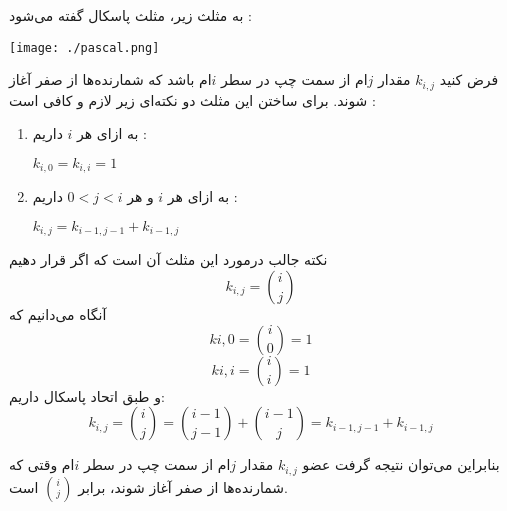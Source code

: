 
به مثلث زیر، مثلث پاسکال گفته می‌شود :

\begin{center}
  \texttt{[image: ./pascal.png]}
\end{center}

فرض کنید
$k_{i,j}$
مقدار 
$j$ام
از سمت چپ در سطر
$i$ام
باشد که شمارنده‌ها از صفر آغاز شوند. برای ساختن این مثلث دو نکته‌ای زیر لازم و کافی است :
\begin{enumerate}
  \item 
  به ازای هر
  $i$
  داریم :
  \begin{center}
    $k_{i,0} = k_{i,i} = 1$
  \end{center}

  \item 
  به ازای هر 
  $i$ و هر
  $0 < j < i$
  داریم :
  \begin{center}
    $k_{i,j} = k_{i-1,j-1} + k_{i-1,j}$
  \end{center}
\end{enumerate}

نکته جالب درمورد این مثلث آن است که اگر قرار دهیم
$$k_{i,j} = {i \choose j}$$
آنگاه می‌دانیم که
$$k{i,0} = {i \choose 0} = 1$$
$$k{i,i} = {i \choose i} = 1$$
و طبق اتحاد پاسکال داریم:
$$k_{i,j} = {i \choose j} = {i-1 \choose j-1} + {i-1 \choose j} = k_{i-1,j-1} + k_{i-1,j}$$

بنابراین می‌توان نتیجه گرفت عضو
$k_{i,j}$
مقدار 
$j$ام
از سمت چپ در سطر
$i$ام
وقتی که شمارنده‌ها از صفر آغاز شوند، برابر 
$i \choose j$
است.
